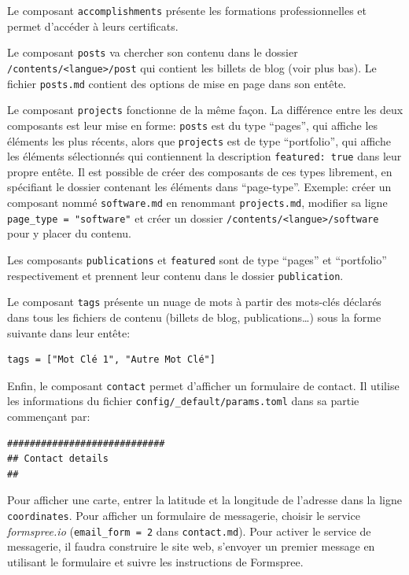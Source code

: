 \documentclass[
  11pt,
  french,
  a4paper,
  extrafontsizes,onecolumn,openright
  ]{memoir}
\begin{document}
Le composant \texttt{accomplishments} présente les formations professionnelles et permet d'accéder à leurs certificats.

Le composant \texttt{posts} va chercher son contenu dans le dossier \texttt{/contents/\textless{}langue\textgreater{}/post} qui contient les billets de blog (voir plus bas).
Le fichier \texttt{posts.md} contient des options de mise en page dans son entête.

Le composant \texttt{projects} fonctionne de la même façon.
La différence entre les deux composants est leur mise en forme: \texttt{posts} est du type ``pages'', qui affiche les éléments les plus récents, alors que \texttt{projects} est de type ``portfolio'', qui affiche les éléments sélectionnés qui contiennent la description \texttt{featured:\ true} dans leur propre entête.
Il est possible de créer des composants de ces types librement, en spécifiant le dossier contenant les éléments dans ``page-type''.
Exemple: créer un composant nommé \texttt{software.md} en renommant \texttt{projects.md}, modifier sa ligne \texttt{page\_type\ =\ "software"} et créer un dossier \texttt{/contents/\textless{}langue\textgreater{}/software} pour y placer du contenu.

Les composants \texttt{publications} et \texttt{featured} sont de type ``pages'' et ``portfolio'' respectivement et prennent leur contenu dans le dossier \texttt{publication}.

Le composant \texttt{tags} présente un nuage de mots à partir des mots-clés déclarés dans tous les fichiers de contenu (billets de blog, publications\ldots) sous la forme suivante dans leur entête:

\begin{verbatim}
tags = ["Mot Clé 1", "Autre Mot Clé"]
\end{verbatim}

Enfin, le composant \texttt{contact} permet d'afficher un formulaire de contact.
Il utilise les informations du fichier \texttt{config/\_default/params.toml} dans sa partie commençant par:

\begin{verbatim}
############################
## Contact details
##
\end{verbatim}

Pour afficher une carte, entrer la latitude et la longitude de l'adresse dans la ligne \texttt{coordinates}.
Pour afficher un formulaire de messagerie, choisir le service \emph{formspree.io} (\texttt{email\_form\ =\ 2} dans \texttt{contact.md}).
Pour activer le service de messagerie, il faudra construire le site web, s'envoyer un premier message en utilisant le formulaire et suivre les instructions de Formspree.
\end{document}
